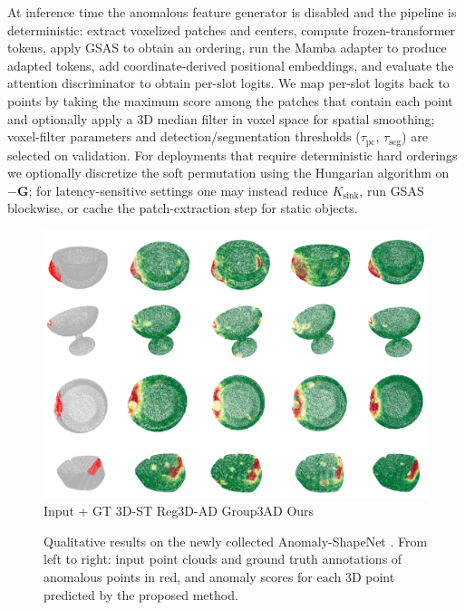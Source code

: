 At inference time the anomalous feature generator is disabled and the pipeline is deterministic: extract voxelized patches and centers, compute frozen-transformer tokens, apply GSAS to obtain an ordering, run the Mamba adapter to produce adapted tokens, add coordinate-derived positional embeddings, and evaluate the attention discriminator to obtain per-slot logits. We map per-slot logits back to points by taking the maximum score among the patches that contain each point and optionally apply a 3D median filter in voxel space for spatial smoothing; voxel-filter parameters and detection/segmentation thresholds ($\tau_{\mathrm{pc}}$, $\tau_{\mathrm{seg}}$) are selected on validation. For deployments that require deterministic hard orderings we optionally discretize the soft permutation using the Hungarian algorithm on $-\mathbf{G}$; for latency-sensitive settings one may instead reduce $K_{\mathrm{sink}}$, run GSAS blockwise, or cache the patch-extraction step for static objects.

\begin{figure}[!ht]
    \includegraphics[width=\linewidth]{figs/shapenet}  
    Input + GT \hspace{1.2cm} 3D-ST \cite{bergmann2023anomaly} \hspace{1.3cm} Reg3D-AD \cite{liu2023real3d} \hspace{1.5cm} Group3AD   \cite{zhu2024towards} \hspace{1.7cm} Ours \hspace{0.8cm}
    \caption{Qualitative results on the newly collected Anomaly-ShapeNet \cite{li2024towards}. From left to right: input point clouds and ground truth annotations of anomalous points in red, and anomaly scores for each 3D point predicted by the proposed method.}
    \label{fig:shapenet}
\end{figure}
  
